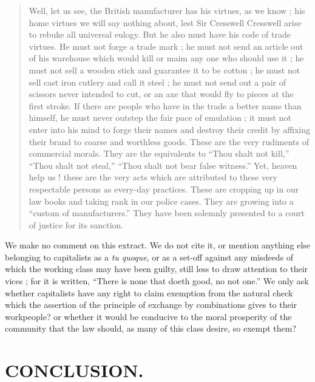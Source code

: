 \begin{quote}
Well, let us see, the British manufacturer has his virtues, as we know
; his home virtues we will say nothing about, lest Sir Cresswell
Cresswell arise to rebuke all universal eulogy. But he also must have
his code of trade virtues. He must not forge a trade mark ; he must not
send an article out of his warehouse which would kill or maim any one
who should use it ; he must not sell a wooden stick and guarantee it to
be cotton ; he must not sell cast iron cutlery and call it steel ; he
must not send out a pair of scissors never intended to cut, or an axe
that would fly to pieces at the first stroke. If there are people who
have in the trade a better name than himself, he must never outstep the
fair pace of emulation ; it must not enter into his mind to forge their
names and destroy their credit by affixing their brand to coarse and
worthless goods. These are the very rudiments of commercial morals.
They are the equivalents to ``Thou shalt not kill,'' ``Thou shalt not
steal,'' ``Thou shalt not bear false witness.'' Yet, heaven help us !
these are the very acts which are attributed to these very respectable
persons as every-day practices. These are cropping up in our law books
and taking rank in our police cases. They are growing into a ``custom
of manufacturers.'' They have been solemnly presented to a court of
justice for its sanction.
\end{quote}

We make no comment on this extract. We do not cite it, or mention
anything else belonging to capitalists as a \textit{tu quoque}, or as
a set-off against any misdeeds of which the working class may have been
guilty, still less to draw attention to their vices ; for it is written,
``There is none that doeth good, no not one.'' We only ask whether
capitalists have any right to claim exemption from the natural check
which the assertion of the principle of exchange by combinations gives
to their workpeople? or whether it would be conducive to the moral
prosperity of the community that the law should, as many of this class
desire, so exempt them?

\section{CONCLUSION.}

